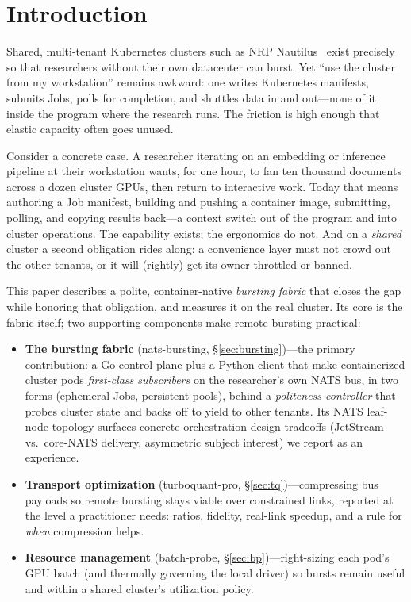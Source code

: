 \documentclass[conference]{IEEEtran}
\begin{document}
\section{Introduction}
Shared, multi-tenant Kubernetes clusters such as NRP Nautilus~\cite{nautilus} exist precisely so
that researchers without their own datacenter can burst. Yet ``use the cluster from my
workstation'' remains awkward: one writes Kubernetes manifests, submits Jobs, polls for
completion, and shuttles data in and out---none of it inside the program where the research runs.
The friction is high enough that elastic capacity often goes unused.

Consider a concrete case. A researcher iterating on an embedding or inference pipeline at their
workstation wants, for one hour, to fan ten thousand documents across a dozen cluster GPUs, then
return to interactive work. Today that means authoring a Job manifest, building and pushing a
container image, submitting, polling, and copying results back---a context switch out of the
program and into cluster operations. The capability exists; the ergonomics do not. And on a
\emph{shared} cluster a second obligation rides along: a convenience layer must not crowd out the
other tenants, or it will (rightly) get its owner throttled or banned.

This paper describes a polite, container-native \emph{bursting fabric} that closes the gap while
honoring that obligation, and measures it on the real cluster. Its core is the fabric
itself; two supporting components make remote bursting practical:

\begin{itemize}
\item \textbf{The bursting fabric} (nats-bursting, \S\ref{sec:bursting})---the primary
contribution: a Go control plane plus a Python client that make containerized cluster pods
\emph{first-class subscribers} on the researcher's own NATS bus, in two forms (ephemeral Jobs,
persistent pools), behind a \emph{politeness controller} that probes cluster state and backs off
to yield to other tenants. Its NATS leaf-node topology surfaces concrete orchestration design
tradeoffs (JetStream vs.\ core-NATS delivery, asymmetric subject interest) we report as an
experience.
\item \textbf{Transport optimization} (turboquant-pro, \S\ref{sec:tq})---compressing bus payloads
so remote bursting stays viable over constrained links, reported at the level a practitioner
needs: ratios, fidelity, real-link speedup, and a rule for \emph{when} compression helps.
\item \textbf{Resource management} (batch-probe, \S\ref{sec:bp})---right-sizing each pod's GPU
batch (and thermally governing the local driver) so bursts remain useful and within a shared
cluster's utilization policy.
\end{itemize}
\end{document}
